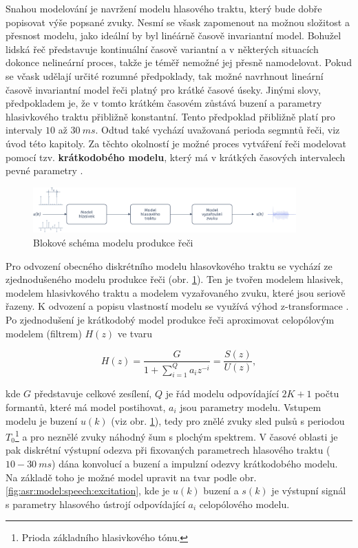 Snahou modelování je navržení modelu hlasového traktu, který bude dobře popisovat výše popsané zvuky. Nesmí se všask zapomenout na možnou složitost a přesnost modelu, jako ideální by byl linéárně časově invariantní model. Bohužel lidská řeč představuje kontinuální časově variantní a v některých situacích dokonce nelineární proces, takže je téměř nemožné jej přesně namodelovat. Pokud se včask udělají určité rozumné předpoklady, tak možné navrhnout lineární časově invariantní model řeči platný pro krátké časové úseky. Jinými slovy, předpokladem je, že v tomto krátkém časovém zůstává buzení a parametry hlasivkového traktu přibližně konstantní. Tento předpoklad přibližně platí pro intervaly $10$ až $30\ ms$. Odtud také vychází uvažovaná perioda segmntů řeči, viz úvod této kapitoly. Za těchto okolností je možné proces vytváření řeči modelovat pomocí tzv. \textbf{krátkodobého modelu}, který má v krátkých časových intervalech pevné parametry \cite{Holmes2001}.

\begin{figure}[hbpt]
  \centering
  \includegraphics[width=0.9\textwidth]{./ch4-asr/img/speech_model.pdf}
  \caption{Blokové schéma modelu produkce řeči}
  \label{fig:asr:model:speech}
\end{figure}

Pro odvození obecného diskrétního modelu hlasovkového traktu se vychází ze zjednodušeného modelu produkce řeči (obr. \ref{fig:asr:model:speech}). Ten je tvořen modelem hlasivek, modelem hlasivkového traktu a modelem vyzařovaného zvuku, které jsou seriově řazeny. K odvození a popisu vlastností modelu se využívá výhod z-transformace \cite{Psutka2006}. Po zjednodušení je krátkodobý model produkce řeči aproximovat celopólovým modelem (filtrem) $H(z)$ ve tvaru

\begin{equation}
  H(z) = \frac{G}{1 + \sum_{i = 1}^{Q} a_{i} z^{-i}} = \frac{S(z)}{U(z)},
  \label{eq:asr:lpc:generic}
\end{equation}

\noindent kde $G$ představuje celkové zesílení, $Q$ je řád modelu odpovídající $2K + 1$ počtu formantů, které má model postihovat, $a_i$ jsou parametry modelu. Vstupem modelu je buzení $u(k)$ (viz obr. \ref{fig:asr:model:speech}), tedy pro znělé zvuky sled pulsů s periodou $T_0$\footnote{Prioda základního hlasivkového tónu.} a pro neznělé zvuky náhodný šum s plochým spektrem. V časové oblasti je pak diskrétní výstupní odezva při fixovaných parametrech hlasového traktu ($10 - 30\ ms$) dána konvolucí a buzení a impulzní odezvy krátkodobého modelu. Na základě toho je možné model upravit na tvar podle obr. \ref{fig:asr:model:speech:excitation}, kde je $u(k)$ buzení a $s(k)$ je výstupní signál s parametry hlasového ústrojí odpovídající $a_i$ celopólového modelu.

